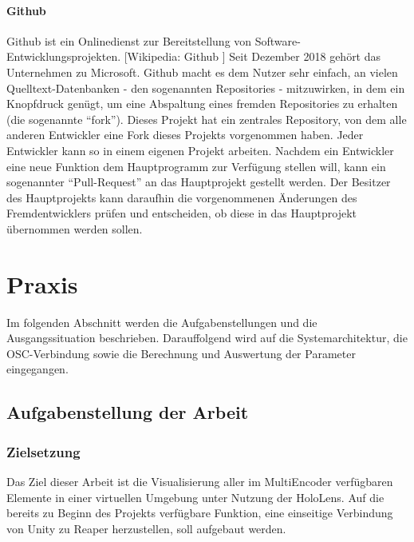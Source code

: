 \documentclass[11pt, titlepage, fleqn]{report}
\begin{document}
                \subsubsection{Github}
                    Github ist ein Onlinedienst zur Bereitstellung von 
                    Software-Entwicklungsprojekten. [Wikipedia: Github 
                    \cite{Github}] 
                    Seit Dezember 2018 gehört das 
                    Unternehmen zu Microsoft. Github macht es dem Nutzer sehr einfach, an vielen Quelltext-Datenbanken - den sogenannten 
                    Repositories - mitzuwirken, in dem ein Knopfdruck genügt, 
                    um eine Abspaltung eines fremden Repositories zu erhalten 
                    (die sogenannte “fork”).\newline
                    Dieses Projekt hat ein zentrales Repository, von dem alle 
                    anderen Entwickler eine Fork dieses Projekts vorgenommen 
                    haben.
                    Jeder Entwickler kann so in einem eigenen Projekt arbeiten.
                    Nachdem ein Entwickler eine neue Funktion dem Hauptprogramm zur Verfügung stellen will, kann ein sogenannter “Pull-Request” 
                    an das Hauptprojekt gestellt werden. Der Besitzer des Hauptprojekts kann daraufhin die vorgenommenen Änderungen des Fremdentwicklers 
                    prüfen und entscheiden, ob diese in das Hauptprojekt übernommen werden sollen.
    \chapter{Praxis}%
    \label{sec:Praxis}
    Im folgenden Abschnitt werden die Aufgabenstellungen und die 
    Ausgangssituation beschrieben. Darauffolgend wird auf die 
    Systemarchitektur, die 
    OSC-Verbindung sowie die Berechnung und Auswertung der Parameter 
    eingegangen.            
        \section{Aufgabenstellung der Arbeit}
        \label{sec:3.1}
            \subsection*{Zielsetzung}
                Das Ziel dieser Arbeit ist die Visualisierung aller im MultiEncoder verfügbaren Elemente in einer virtuellen 
                Umgebung unter Nutzung der HoloLens. Auf die bereits zu Beginn des Projekts verfügbare Funktion, eine einseitige 
                Verbindung von Unity zu Reaper herzustellen, soll aufgebaut werden.
\end{document}
